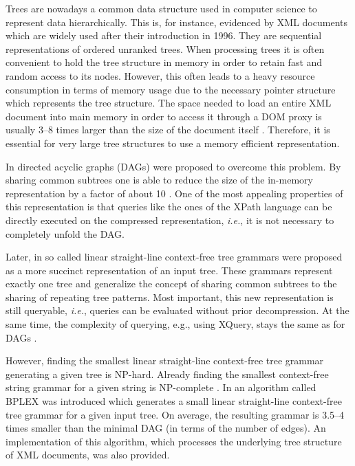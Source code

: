 \documentclass[12pt]{llncs}
\newcommand{\hairsp}{\hspace{1pt}}\newcommand{\TODO}{\textcolor{red}{\bf TODO!}\xspace}
\newcommand{\ie}{\mbox{\textit{i.\hairsp{}e.}}\xspace}
\begin{document}
Trees are nowadays a common data structure used in computer science to
represent data hierarchically. This is, for instance, evidenced by XML
documents which are widely used after their introduction in 1996. They
are sequential representations of ordered unranked trees.	When
processing trees it is often convenient to hold the tree structure in
memory in order to retain fast and random access to its
nodes. However, this often leads to a heavy resource consumption in
terms of memory usage due to the necessary pointer structure which
represents the tree structure. The space needed to load an entire XML
document into main memory in order to access it through a DOM proxy is
usually 3--8 times larger than the size of the document itself
\cite{Wang07space}. Therefore, it is essential for very large tree
structures to use a memory 
efficient representation. 

In \cite{Frick03query,Buneman03path} directed acyclic graphs (DAGs) were proposed to overcome 
this problem. By sharing common subtrees one is able to reduce the
size of the in-memory representation by a factor of about 10
\cite{Buneman03path}. One of the most appealing properties of this
representation is that queries like the ones of the XPath language can
be directly executed on the compressed representation, \ie, it is not
necessary to completely unfold the DAG.

Later, in \cite{Busatto08efficient} so called linear straight-line
context-free tree grammars were proposed as a more succinct
representation of an input tree. These grammars represent exactly one
tree and generalize the concept of sharing common subtrees to the
sharing of repeating tree patterns. Most important, this new
representation is still queryable, \ie, queries can be evaluated
without prior decompression. At the same time, the complexity of
querying, e.g., using XQuery, stays the same as for 
DAGs \cite{Lohrey2006complexity}.

However, finding the smallest linear straight-line context-free tree
grammar generating a given tree is NP-hard. Already finding the
smallest context-free string grammar for a given string is NP-complete
\cite{Charikar05smallest}. In \cite{Busatto08efficient} an algorithm
called BPLEX was introduced which generates a small linear
straight-line context-free tree grammar for a given input tree. On
average, the resulting grammar is 3.5--4 times smaller than the
minimal DAG (in terms of the number of edges). 
An implementation of this algorithm, which 
processes the underlying tree structure of XML documents, was also provided.
\end{document}
